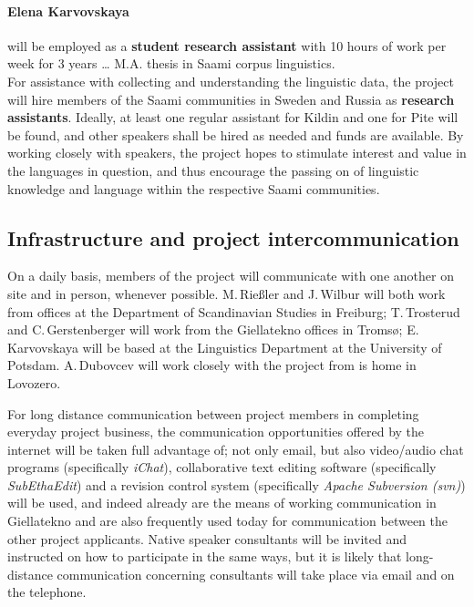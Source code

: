 \documentclass[a4paper,12pt]{article}
\begin{document}
{{{{\paragraph{Elena Karvovskaya} will be employed as a \textbf{student research assistant} with 10 hours of work per week for 3 years … M.A. thesis in Saami corpus linguistics.\\

For assistance with collecting and understanding the linguistic data, the project will hire members of the Saami communities in Sweden and Russia as \textbf{research assistants}. %
Ideally, at least one regular assistant for Kildin and one for Pite will be found, and other speakers shall be hired as needed and funds are available. By working closely with speakers, the project hopes to stimulate interest and value in the languages in question, and thus encourage the passing on of linguistic knowledge and language within the respective Saami communities.

\subsection{Infrastructure and project intercommunication}
On a daily basis, members of the project will communicate with one another on site and in person, whenever possible. M.\,Rießler and J.\,Wilbur will both work from offices at the Department of Scandinavian Studies in Freiburg; T.\,Trosterud and C.\,Gerstenberger will work from the Giellatekno offices in Tromsø; E.\,Karvovskaya will be based at the Linguistics Department at the University of Potsdam. A.\,Dubovcev will work closely with the project from is home in Lovozero.

For long distance communication between project members in completing everyday project business, the communication opportunities offered by the internet will be taken full advantage of; not only email, but also video/audio chat programs (specifically \textit{iChat}), collaborative text editing software (specifically \textit{SubEthaEdit}) and a revision control system (specifically \textit{Apache Subversion (svn)}) will be used, and indeed already are the means of working communication in Giellatekno and are also frequently used today for communication between the other project applicants. Native speaker consultants will be invited and instructed on how to participate in the same ways, but it is likely that long-distance communication concerning consultants will take place via email and on the telephone.

}}}}
\end{document}
